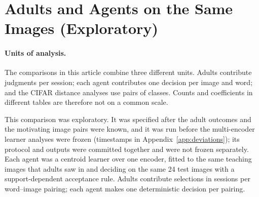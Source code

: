 \documentclass[11pt]{article}
\begin{document}
\section{Adults and Agents on the Same Images (Exploratory)}
\label{sec:matched}

\paragraph{Units of analysis.} The comparisons in this article combine three different units. Adults contribute judgments per session; each agent contributes one decision per image and word; and the CIFAR distance analyses use pairs of classes. Counts and coefficients in different tables are therefore not on a common scale.


This comparison was exploratory. It was specified after the adult outcomes and the motivating image pairs were known, and it was run before the multi-encoder learner analyses were frozen (timestamps in Appendix~\ref{app:deviations}); its protocol and outputs were committed together and were not frozen separately. Each agent was a centroid learner over one encoder, fitted to the same teaching images that adults saw in \textcite{lewis2018} and deciding on the same 24 test images with a support-dependent acceptance rule. Adults contribute selections in \VtXPerCell{} sessions per word--image pairing; each agent makes one deterministic decision per pairing.
\end{document}
